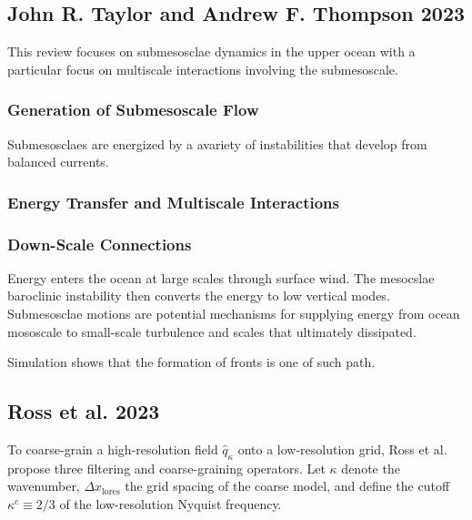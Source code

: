 \documentclass[../SQG_notes.tex]{subfiles}
\begin{document}


    \subsection{John R. Taylor and Andrew F. Thompson 2023}

    This review focuses on submesosclae dynamics in the upper ocean with a particular focus on multiscale interactions involving the submesoscale. 

    \subsubsection{Generation of Submesoscale Flow}
    Submesosclaes are energized by a avariety of instabilities that develop from balanced currents. 

    \subsubsection{Energy Transfer and Multiscale Interactions}
    \subsubsection*{Down-Scale Connections}
    Energy enters the ocean at large scales through surface wind. The mesocslae baroclinic instability then converts the energy to low vertical modes. Submesosclae motions are potential mechanisms for supplying energy from ocean mososcale to small-scale turbulence and scales that ultimately dissipated. 

    Simulation shows that the formation of fronts is one of such path. 

    \subsection{Ross et al. 2023}
    To coarse-grain a high-resolution field $\hat{q}_\kappa$ onto a low-resolution grid, Ross et al. propose three filtering and coarse-graining operators. Let $\kappa$ denote the wavenumber, $\Delta x_{\text{lores}}$ the grid spacing of the coarse model, and define the cutoff $\kappa^c \equiv 2/3$ of the low-resolution Nyquist frequency.
\end{document}
